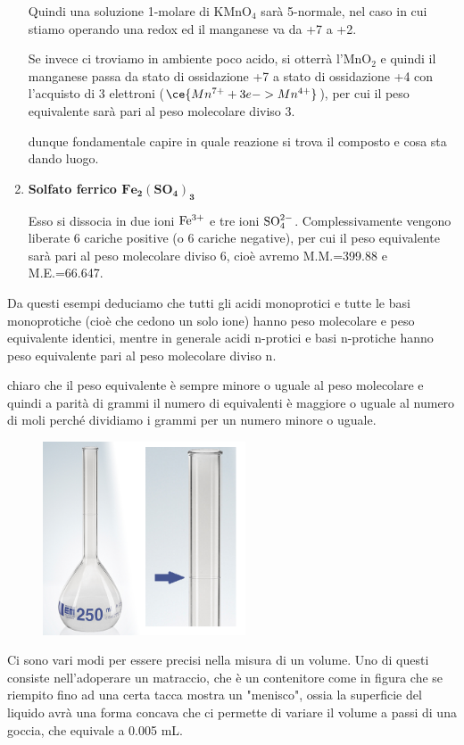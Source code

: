 \begin{enumerate}
    Quindi una soluzione 1-molare di KMnO$_4$ sarà 5-normale, nel caso in cui stiamo operando una redox ed il manganese va da +7 a +2. 
    
    \vspace{0.2cm}Se invece ci troviamo in ambiente poco acido, si otterrà l'MnO$_2$ e quindi il manganese passa da stato di ossidazione +7 a stato di ossidazione +4 con l'acquisto di 3 elettroni ($\ce{Mn^{7+} + 3e -> Mn^{4+}}$), per cui il peso equivalente sarà pari al peso molecolare diviso 3.

    \E dunque fondamentale capire in quale reazione si trova il composto e cosa sta dando luogo.

    \item \textbf{Solfato ferrico $\mathbf{Fe_2(SO_4)_3}$}

    Esso si dissocia in due ioni $\rm Fe^{3+}$ e tre ioni $\rm SO_4^{2-}$. Complessivamente vengono liberate 6 cariche positive (o 6 cariche negative), per cui il peso equivalente sarà pari al peso molecolare diviso 6, cioè avremo M.M.=399.88 e M.E.=66.647.
\end{enumerate}

Da questi esempi deduciamo che tutti gli acidi monoprotici e tutte le basi monoprotiche (cioè che cedono un solo ione) hanno peso molecolare e peso equivalente identici, mentre in generale acidi n-protici e basi n-protiche hanno peso equivalente pari al peso molecolare diviso n.

\E chiaro che il peso equivalente è sempre minore o uguale al peso molecolare e quindi a parità di grammi il numero di equivalenti è maggiore o uguale al numero di moli perché dividiamo i grammi per un numero minore o uguale.

\hspace{1cm}\begin{minipage}{0.42\textwidth}
    \begin{figure}[H]
        \includegraphics[width=6cm]{immagini/matraccio.png}
    \end{figure}
\end{minipage}
\begin{minipage}{0.5\textwidth}
    Ci sono vari modi per essere precisi nella misura di un volume. Uno di questi consiste nell'adoperare un matraccio, che è un contenitore come in figura che se riempito fino ad una certa tacca mostra un "menisco", ossia la superficie del liquido avrà una forma concava che ci permette di variare il volume a passi di una goccia, che equivale a 0.005 mL.
\end{minipage}

